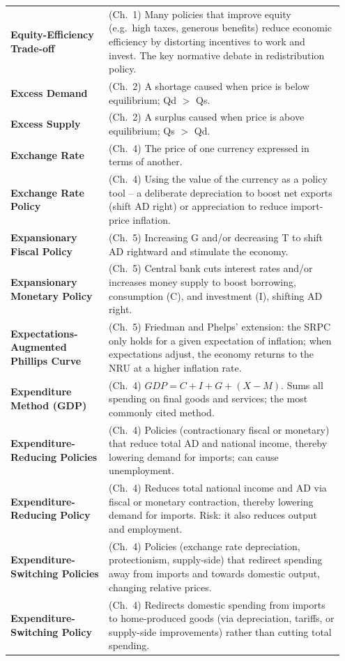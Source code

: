 \documentclass[11pt, a4paper, twoside]{book}
\begin{document}
\begin{longtable}{@{}>{\RaggedRight\arraybackslash}p{0.28\linewidth}>{\RaggedRight\arraybackslash}p{0.67\linewidth}@{}}
\textbf{Equity-Efficiency Trade-off} & (Ch.~1) Many policies that improve equity (e.g.\ high taxes, generous benefits) reduce economic efficiency by distorting incentives to work and invest. The key normative debate in redistribution policy. \\
\textbf{Excess Demand} & (Ch.~2) A shortage caused when price is below equilibrium; Qd $>$ Qs. \\
\textbf{Excess Supply} & (Ch.~2) A surplus caused when price is above equilibrium; Qs $>$ Qd. \\
\textbf{Exchange Rate} & (Ch.~4) The price of one currency expressed in terms of another. \\
\textbf{Exchange Rate Policy} & (Ch.~4) Using the value of the currency as a policy tool -- a deliberate depreciation to boost net exports (shift AD right) or appreciation to reduce import-price inflation. \\
\textbf{Expansionary Fiscal Policy} & (Ch.~5) Increasing G and/or decreasing T to shift AD rightward and stimulate the economy. \\
\textbf{Expansionary Monetary Policy} & (Ch.~5) Central bank cuts interest rates and/or increases money supply to boost borrowing, consumption (C), and investment (I), shifting AD right. \\
\textbf{Expectations-Augmented Phillips Curve} & (Ch.~5) Friedman and Phelps' extension: the SRPC only holds for a given expectation of inflation; when expectations adjust, the economy returns to the NRU at a higher inflation rate. \\
\textbf{Expenditure Method (GDP)} & (Ch.~4) $GDP = C + I + G + (X - M)$. Sums all spending on final goods and services; the most commonly cited method. \\
\textbf{Expenditure-Reducing Policies} & (Ch.~4) Policies (contractionary fiscal or monetary) that reduce total AD and national income, thereby lowering demand for imports; can cause unemployment. \\
\textbf{Expenditure-Reducing Policy} & (Ch.~4) Reduces total national income and AD via fiscal or monetary contraction, thereby lowering demand for imports. Risk: it also reduces output and employment. \\
\textbf{Expenditure-Switching Policies} & (Ch.~4) Policies (exchange rate depreciation, protectionism, supply-side) that redirect spending away from imports and towards domestic output, changing relative prices. \\
\textbf{Expenditure-Switching Policy} & (Ch.~4) Redirects domestic spending from imports to home-produced goods (via depreciation, tariffs, or supply-side improvements) rather than cutting total spending. \\

\end{longtable}
\end{document}
